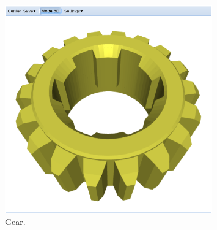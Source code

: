 \documentclass[article,A4,12pt]{llncs}
\begin{document}
\begin{figure}[!ht]
\begin{center}
\includegraphics[width=0.8\textwidth]{img/gear.png}
\end{center}
\vspace{-2mm}
\caption{Gear.}
\label{fig:gear}
\end{figure}
\noindent
\end{document}

